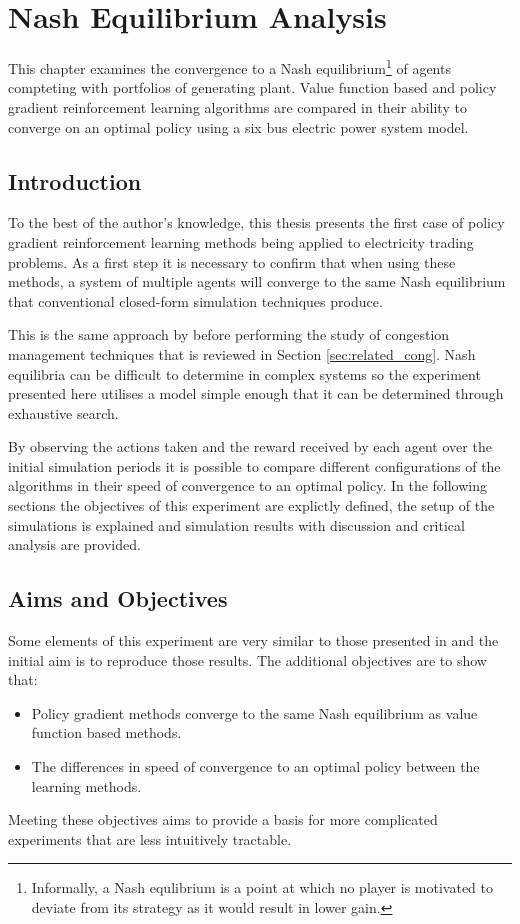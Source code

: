 \chapter{Nash Equilibrium Analysis}
\label{ch:nashanalysis}
This chapter examines the convergence to a Nash
equilibrium\footnote{Informally, a Nash equlibrium is a point at which no
player is motivated to deviate from its strategy as it would result in lower
gain.} of agents compteting with portfolios of generating plant.  Value
function based and policy gradient reinforcement learning algorithms are
compared in their ability to converge on an optimal policy using a six bus
electric power system model.

\section{Introduction}
To the best of the author's knowledge, this thesis presents the first case of
policy gradient reinforcement learning methods being applied to electricity
trading problems.  As a first step it is necessary to confirm that when using
these methods, a system of multiple agents will converge to the same Nash
equilibrium that conventional closed-form simulation techniques produce.

This is the same approach by  before performing the study
of congestion management techniques that is reviewed in Section
\ref{sec:related_cong}.  Nash equilibria can be difficult
to determine in complex systems so the experiment presented here utilises a
model simple enough that it can be determined through exhaustive search.

By observing the actions taken and the reward received by each agent over the
initial simulation periods it is possible to compare different configurations
of the algorithms in their speed of convergence to an optimal policy.  In the
following sections the objectives of this experiment are explictly defined, the
setup of the simulations is explained and simulation results with discussion
and critical analysis are provided.

\section{Aims and Objectives}
Some elements of this experiment are very similar to those presented in
 and the initial aim is to reproduce those results.
The additional objectives are to show that:
\begin{itemize}
  \item Policy gradient methods converge to the same Nash equilibrium as value
  function based methods.
  \item The differences in speed of convergence to an optimal policy between
  the learning methods.
\end{itemize}
Meeting these objectives aims to provide a basis for more complicated
experiments that are less intuitively tractable.

